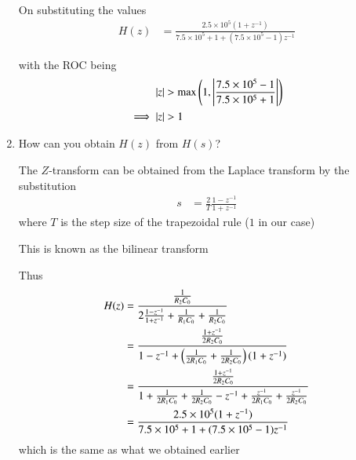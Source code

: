 \documentclass[journal,12pt,twocolumn]{IEEEtran}
\renewcommand\thesection{\arabic{section}}
\begin{document}
\begin{enumerate}[label=\thesection.\arabic*.,ref=\thesection.\theenumi]
    On substituting the values
    \begin{align}
        H(z) &= \frac{2.5\times10^5 (1+z^{-1})}{7.5\times10^5 + 1 + (7.5\times10^5 - 1)z^{-1}}
    \end{align}
    
    with the ROC being
    \begin{align}
        \left\vert z\right\vert &> \max\left(1, \left\vert\frac{7.5\times10^5 - 1}{7.5\times10^5 + 1}\right\vert\right) \\
        \implies \left\vert z\right\vert &> 1
    \end{align}
    
    \item How can you obtain $H(z)$ from $H(s)$?
    
    \solution The $Z$-transform can be obtained from the Laplace transform by the substitution
    \begin{align}
        s &= \frac{2}{T} \frac{1-z^{-1}}{1+z^{-1}}
    \end{align}
    where $T$ is the step size of the trapezoidal rule ($1$ in our case)
    
    This is known as the bilinear transform
    
    Thus
    \begin{align}
        H(z) &= \frac{\frac{1}{R_2C_0}}{2\frac{1-z^{-1}}{1+z^{-1}} + \frac{1}{R_1C_0} + \frac{1}{R_2C_0}} \\
        &= \frac{\frac{1 + z^{-1}}{2R_2C_0}}{1-z^{-1}	 + \left(\frac{1}{2R_1C_0} + \frac{1}{2R_2C_0}\right)(1 + z^{-1})} \\
        &= \frac{\frac{1 + z^{-1}}{2R_2C_0}}{1 + \frac{1}{2R_1C_0} + \frac{1}{2R_2C_0} - z^{-1} + \frac{z^{-1}}{2R_1C_0} + \frac{z^{-1}}{2R_2C_0}} \\
        &= \frac{2.5\times10^5 (1+z^{-1})}{7.5\times10^5 + 1 + (7.5\times10^5 - 1)z^{-1}}
    \end{align}
    which is the same as what we obtained earlier



\end{enumerate}
\end{document}
